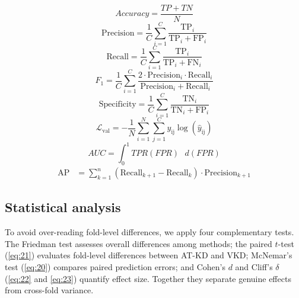 \documentclass[preprint,review,12pt]{elsarticle}
\begin{document}
\begin{equation}\label{eq:11}
Accuracy = \frac{TP + TN}{N}
\end{equation}
\begin{equation}\label{eq:12}
\text{Precision}  =  \frac{1}{C}\sum_{i = 1}^{C}\frac{\text{TP}_{i}}{\text{TP}_{i}  +  \text{FP}_{i}}
\end{equation}
\begin{equation}\label{eq:13}
\text{Recall}  =  \frac{1}{C}\sum_{i = 1}^{C}\frac{\text{TP}_{i}}{\text{TP}_{i}  +  \text{FN}_{i}}
\end{equation}
\begin{equation}\label{eq:14}
F_{1}  =  \frac{1}{C}\sum_{i = 1}^{C}\frac{2  \cdot  \text{Precision}_{i}  \cdot  \text{Recall}_{i}}{\text{Precision}_{i}  +  \text{Recall}_{i}}
\end{equation}
\begin{equation}\label{eq:15}
\text{Specificity} = \frac{1}{C}\sum_{i=1}^{C}\frac{\text{TN}_{i}}{\text{TN}_{i} + \text{FP}_{i}}
\end{equation}
\begin{equation}\label{eq:16}
\mathcal{L}_{\text{val}} = - \frac{1}{N}\sum_{i = 1}^{N}{\sum_{j = 1}^{C}y_{\text{ij}}}\log({\widehat{y}}_{\text{ij}})
\end{equation}
\begin{equation}\label{eq:17}
AUC = \int_{0}^{1}{TPR(FPR)\text{ }d(FPR)}
\end{equation}
\begin{equation}\label{eq:18}
\begin{aligned}
\text{AP} &= \sum_{k=1}^{n}\left( \text{Recall}_{k+1} - \text{Recall}_{k} \right) \cdot \text{Precision}_{k+1}
\end{aligned}
\end{equation}

\subsection{Statistical analysis}

To avoid over-reading fold-level differences, we apply four complementary
tests. The Friedman test assesses overall differences among methods; the
paired $t$-test (\eqref{eq:21}) evaluates fold-level differences between
AT-KD and VKD; McNemar's test (\eqref{eq:20}) compares paired prediction
errors; and Cohen's $d$ and Cliff's $\delta$ (\eqref{eq:22} and
\eqref{eq:23}) quantify effect size. Together they separate genuine
effects from cross-fold variance.
\end{document}
